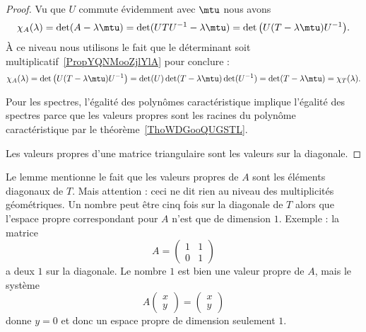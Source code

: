 \begin{proof}
    Vu que \( U\) commute évidemment avec \( \mtu\) nous avons
    \begin{equation}
        \chi_A(\lambda)=\det(A-\lambda \mtu)=\det(UTU^{-1}-\lambda\mtu)=\det\big( U(T-\lambda\mtu)U^{-1} \big).
    \end{equation}
    À ce niveau nous utilisons le fait que le déterminant soit multiplicatif~\ref{PropYQNMooZjlYlA} pour conclure :
    \begin{equation}
        \chi_A(\lambda)=\det\big( U(T-\lambda\mtu)U^{-1} \big)=\det(U)\det(T-\lambda\mtu)\det(U^{-1})=\det(T-\lambda\mtu)=\chi_T(\lambda).
    \end{equation}

    Pour les spectres, l'égalité des polynômes caractéristique implique l'égalité des spectres parce que les valeurs propres sont les racines du polynôme caractéristique par le théorème~\ref{ThoWDGooQUGSTL}.

    Les valeurs propres d'une matrice triangulaire sont les valeurs sur la diagonale.
\end{proof}

\begin{remark}
    Le lemme mentionne le fait que les valeurs propres de \( A\) sont les éléments diagonaux de \( T\). Mais attention : ceci ne dit rien au niveau des multiplicités géométriques. Un nombre peut être cinq fois sur la diagonale de \( T\) alors que l'espace propre correspondant pour \( A\) n'est que de dimension \( 1\). Exemple : la matrice
    \begin{equation}
        A=\begin{pmatrix}
            1    &   1    \\
            0    &   1
        \end{pmatrix}
    \end{equation}
    a deux \( 1\) sur la diagonale. Le nombre \( 1\) est bien une valeur propre de \( A\), mais le système
    \begin{equation}
        A\begin{pmatrix}
            x    \\
            y
        \end{pmatrix}=\begin{pmatrix}
            x    \\
            y
        \end{pmatrix}
    \end{equation}
    donne \( y=0\) et donc un espace propre de dimension seulement \( 1\).
\end{remark}

